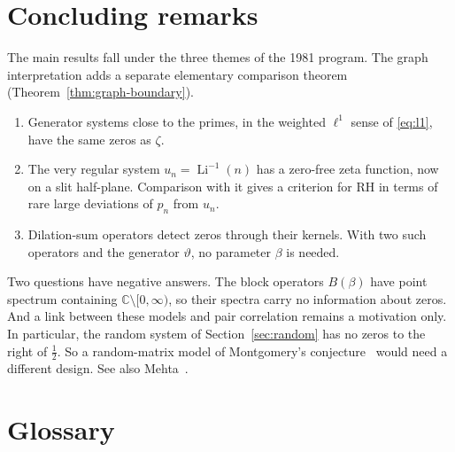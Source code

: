\documentclass[12pt,letterpaper]{article}
\theoremstyle{definition}
\theoremstyle{remark}
\numberwithin{equation}{section}
\newcommand{\Li}{\operatorname{Li}}
\newcommand{\CC}{\mathbb{C}}
\newcommand{\yD}{\vartheta}
\begin{document}
\section{Concluding remarks}\label{sec:conclusion}

The main results fall under the three themes of the 1981 program.  The
graph interpretation adds a separate elementary comparison theorem
(Theorem~\ref{thm:graph-boundary}).
\begin{enumerate}[label=(\arabic*)]
\item Generator systems close to the primes, in the weighted $\ell^1$
  sense of \eqref{eq:l1}, have the same zeros as $\zeta$.
\item The very regular system $u_n=\Li^{-1}(n)$ has a zero-free zeta
  function, now on a slit half-plane. Comparison with it gives a criterion
  for RH in terms of rare large deviations of $p_n$ from $u_n$.
\item Dilation-sum operators detect zeros through their kernels. With two
  such operators and the generator $\yD$, no parameter $\beta$ is needed.
\end{enumerate}

Two questions have negative answers. The block operators $B(\beta)$
have point spectrum containing $\CC\setminus[0,\infty)$, so their spectra
carry no information about zeros. And a link between these models and
pair correlation remains a motivation only. In particular, the random system of
Section~\ref{sec:random} has no zeros to the right of $\frac12$. So a
random-matrix model of Montgomery's conjecture~\cite{Mo73} would
need a different design. See also Mehta~\cite{Me67}.

\appendix
\section{Glossary}\label{app:glossary}
\end{document}
